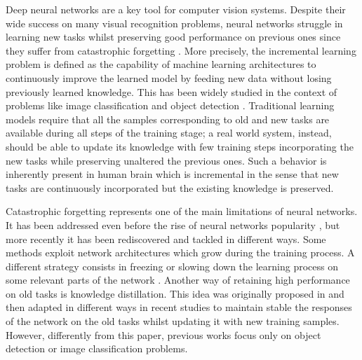 \documentclass[10pt,twocolumn,letterpaper]{article}
\begin{document}
Deep neural networks are a key tool for computer vision systems. Despite their wide success on many visual recognition problems, neural networks struggle in learning new tasks whilst preserving good performance on previous ones since they suffer from catastrophic forgetting \cite{french1999catastrophic, goodfellow2013empirical, mccloskey1989catastrophic}. More precisely, the incremental learning problem is defined as the capability of machine learning architectures to continuously improve the learned model by feeding new data without losing previously learned knowledge. This has been widely studied in the context of problems like image classification and object detection \cite{castro2018end,li2018learning,rebuffi2017icarl,shmelkov2017incremental,wu2018incremental}. 
Traditional learning models  require that all the samples corresponding to old and new tasks are available during all steps of the training stage;  a real world system, instead, should be able to update its knowledge with few training steps incorporating the new tasks while preserving unaltered the previous ones. Such a behavior is inherently present in human brain which is incremental in the sense that new tasks are continuously incorporated but the existing knowledge is  preserved.

Catastrophic forgetting represents one of the main limitations of neural networks. It has been addressed even before the rise of neural networks popularity \cite{cauwenberghs2001incremental,polikar2001learn,thrun1996learning}, but more recently it has been rediscovered and tackled in different ways.
Some methods \cite{istrate2018incremental, roy2018tree, sarwar2017incremental, xiao2014error} exploit network architectures which grow during the training process.
A different strategy consists in freezing or slowing down the learning process on some relevant parts of the network \cite{istrate2018incremental, kirkpatrick2017overcoming, li2018learning, oquab2014learning}.
Another way of retaining high performance on old tasks  is knowledge distillation. This idea was originally proposed in \cite{bucilua2006model, hinton2015distilling} and then adapted in different ways in recent studies \cite{castro2018end, furlanello2016active, li2018learning, rebuffi2017icarl, shmelkov2017incremental, wu2018incremental, zhou2019M2KD} to maintain stable the responses of the network on the old tasks whilst updating it with new training samples. However, differently from this paper, previous works focus only on object detection or image classification problems.
\end{document}
